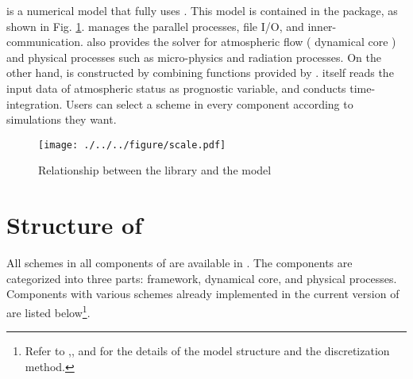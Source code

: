 \scalerm is a numerical model that fully uses \scalelib.
This model is contained in the \scalelib package,
as shown in Fig. \ref{fig:scale-rm}.
\scalelib manages the parallel processes,
file I/O, and inner-communication.
\scalelib also provides the solver for atmospheric flow ( dynamical core )
and physical processes such as micro-physics and radiation processes.
On the other hand,
\scalerm is constructed by combining functions provided by \scalelib.
\scalerm itself reads the input data of atmospheric status as prognostic variable,
and conducts time-integration.
Users can select a scheme in every component according to simulations they want.

\begin{figure}[hbt]
\begin{center}
  \texttt{[image: ./../../figure/scale.pdf]}\\
  \caption{Relationship between the library \scalelib and the model \scalerm}
  \label{fig:scale-rm}
\end{center}
\end{figure}


\section{Structure of \scalerm}  \label{subsec:sturcture_scale_rm}
All schemes in all components of \scalelib are available in \scalerm.
The components are categorized into three parts:
framework, dynamical core, and physical processes.
Components with various schemes already implemented
in the current version of \scalerm are listed below\footnote{Refer to \citet{scale_2015},\citet{satoy_2015b}, and \citet{nishizawa_2015} for the details of the model structure and the discretization method.}.

